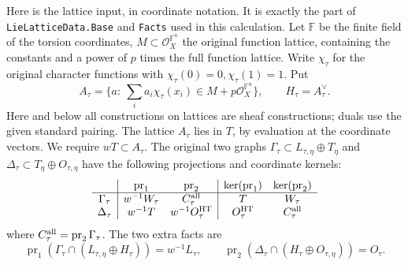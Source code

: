 Here is the lattice input, in coordinate notation. It is exactly the
part of \texttt{LieLatticeData.Base} and \texttt{Facts} used in this
calculation. Let \(\mathbb F\) be the finite field of the torsion
coordinates, \(M\subset\mathcal O_X^{\mathbb F^n}\) the original
function lattice, containing the constants and a power of \(p\) times
the full function lattice. Write \(\chi_\tau\) for the original
character functions with \(\chi_\tau(0)=0,\chi_\tau(1)=1\). Put
\[
 A_\tau=\{a:\ \sum_i a_i\chi_\tau(x_i)
                      \in M+p\mathcal O_X^{\mathbb F^n}\},
 \qquad H_\tau=A_\tau^\vee .
\]
Here and below all constructions on lattices are sheaf constructions;
duals use the given standard pairing. The lattice \(A_\tau\)
lies in \(T\), by evaluation at the coordinate vectors. We require
\(wT\subset A_\tau\). The original two graphs
\(\Gamma_\tau\subset L_{\tau,\eta}\oplus T_\eta\) and
\(\Delta_\tau\subset T_\eta\oplus O_{\tau,\eta}\)
have the following projections and coordinate kernels:
\[
\begin{array}{c|cc|cc}
 &\operatorname{pr}_1&\operatorname{pr}_2&
 \ker(\operatorname{pr}_1)&\ker(\operatorname{pr}_2)\\ \hline
 \Gamma_\tau &w^{-1}W_\tau&C_\tau^{\rm all}&T&W_\tau\\
 \Delta_\tau &w^{-1}T&w^{-1}O_\tau^{\rm HT}
      &O_\tau^{\rm HT}&C_\tau^{\rm all}
\end{array}
\]
where \(C_\tau^{\rm all}=\operatorname{pr}_2\Gamma_\tau\).
The two extra facts are
\[
 \operatorname{pr}_1(\Gamma_\tau\cap(L_{\tau,\eta}\oplus H_\tau))
       =w^{-1}L_\tau,\qquad
 \operatorname{pr}_2(\Delta_\tau\cap(H_\tau\oplus O_{\tau,\eta}))
       =O_\tau.                                                    \tag{RC1}
\]

